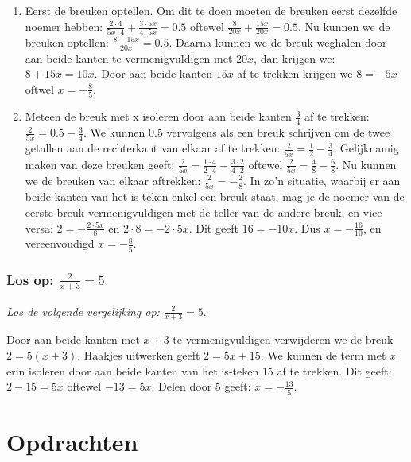 \documentclass[
  a4paper,
]{scrbook}
\theoremstyle{definition}
\theoremstyle{remark}
\begin{document}
\begin{enumerate}
\def\labelenumi{\arabic{enumi}.}
\item
  Eerst de breuken optellen. Om dit te doen moeten de breuken eerst
  dezelfde noemer hebben:
  \(\frac{2\cdot4}{5x\cdot4} + \frac{3\cdot5x}{4\cdot5x} = 0.5\) oftewel
  \(\frac{8}{20x} + \frac{15x}{20x} = 0.5\). Nu kunnen we de breuken
  optellen: \(\frac{8+15x}{20x} = 0.5\). Daarna kunnen we de breuk
  weghalen door aan beide kanten te vermenigvuldigen met \(20x\), dan
  krijgen we: \(8+15x = 10x\). Door aan beide kanten \(15x\) af te
  trekken krijgen we \(8 = -5x\) oftwel \(x = -\frac{8}{5}\).
\item
  Meteen de breuk met x isoleren door aan beide kanten \(\frac{3}{4}\)
  af te trekken: \(\frac{2}{5x} = 0.5-\frac{3}{4}\). We kunnen \(0.5\)
  vervolgens als een breuk schrijven om de twee getallen aan de
  rechterkant van elkaar af te trekken:
  \(\frac{2}{5x} = \frac{1}{2}-\frac{3}{4}\). Gelijknamig maken van deze
  breuken geeft:
  \(\frac{2}{5x} = \frac{1\cdot4}{2\cdot4}-\frac{3\cdot2}{4\cdot2}\)
  oftewel \(\frac{2}{5x} = \frac{4}{8}-\frac{6}{8}\). Nu kunnen we de
  breuken van elkaar aftrekken: \(\frac{2}{5x} = -\frac{2}{8}\). In zo'n
  situatie, waarbij er aan beide kanten van het is-teken enkel een breuk
  staat, mag je de noemer van de eerste breuk vermenigvuldigen met de
  teller van de andere breuk, en vice versa: \(2 = -\frac{2\cdot5x}{8}\)
  en \(2\cdot8 = -2\cdot5x\). Dit geeft \(16 = - 10x\). Dus
  \(x = -\frac{16}{10}\), en vereenvoudigd \(x = -\frac{8}{5}\).
\end{enumerate}

\subsubsection{\texorpdfstring{Los op:
\(\frac{2}{x+3}=5\)}{Los op: \textbackslash frac\{2\}\{x+3\}=5}}

\emph{Los de volgende vergelijking op:} \(\frac{2}{x+3}=5\).

Door aan beide kanten met \(x+3\) te vermenigvuldigen verwijderen we de
breuk \(2 = 5(x+3)\). Haakjes uitwerken geeft \(2 = 5x + 15\). We kunnen
de term met \(x\) erin isoleren door aan beide kanten van het is-teken
\(15\) af te trekken. Dit geeft: \(2-15 = 5x\) oftewel \(-13 = 5x\).
Delen door \(5\) geeft: \(x = -\frac{13}{5}\).

\hypertarget{opdrachten-1}{%
\section{Opdrachten}\label{opdrachten-1}}
\end{document}

